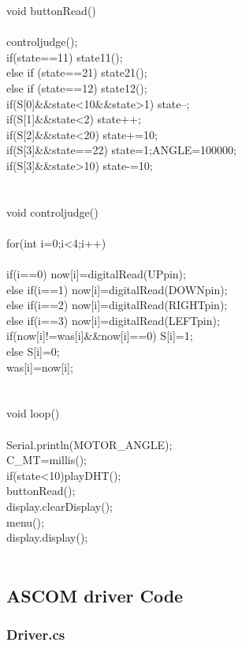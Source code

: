 void buttonRead()\\
{\\
	controljudge();\\
	if(state==11) state11(); \\
	else if (state==21) state21();\\
	else if (state==12) state12();\\
	if(S[0]\&\&state<10\&\&state>1) state--;\\
	if(S[1]\&\&state<2) state++;\\
	if(S[2]\&\&state<20) state+=10;\\
	if(S[3]\&\&state==22) {state=1;ANGLE=100000;}\\
	if(S[3]\&\&state>10) state-=10;\\
	\\
}\\
void controljudge()\\
{\\
	for(int i=0;i<4;i++)\\
	{\\
		if(i==0) now[i]=digitalRead(UPpin);\\
		else if(i==1) now[i]=digitalRead(DOWNpin);\\
		else if(i==2) now[i]=digitalRead(RIGHTpin);\\
		else if(i==3) now[i]=digitalRead(LEFTpin);\\
		if(now[i]!=was[i]\&\&now[i]==0) S[i]=1;\\
		else S[i]=0;\\
		was[i]=now[i];\\
	}\\
}\\
void loop()\\
{\\
	Serial.println(MOTOR\_ANGLE);\\
	C\_MT=millis();\\
	if(state<10)playDHT();\\
	buttonRead();\\
	display.clearDisplay();\\
	menu();\\
	display.display();\\
}\\



\subsection{ASCOM driver Code}
\subsubsection{Driver.cs}


